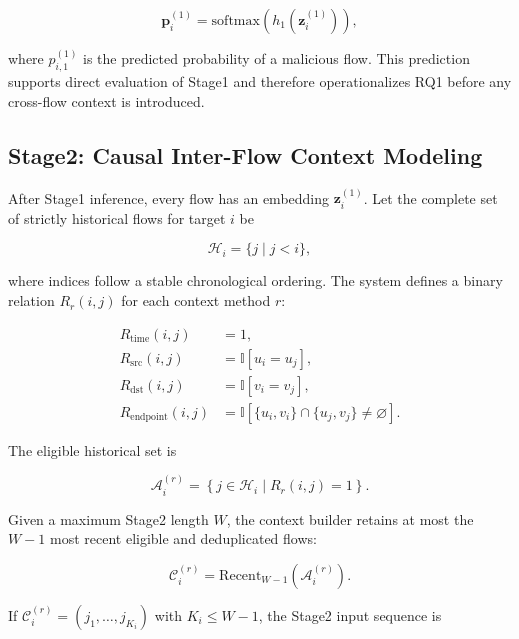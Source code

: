 \begin{equation}
\mathbf{p}^{(1)}_i
=
\mathrm{softmax}
\left(
    h_1(\mathbf{z}^{(1)}_i)
\right),
\end{equation}

where $p^{(1)}_{i,1}$ is the predicted probability of a malicious flow. This
prediction supports direct evaluation of Stage1 and therefore operationalizes
RQ1 before any cross-flow context is introduced.

\subsection{Stage2: Causal Inter-Flow Context Modeling}
\label{subsec:stage2_formulation}

After Stage1 inference, every flow has an embedding
$\mathbf{z}^{(1)}_i$. Let the complete set of strictly historical flows for
target $i$ be

\begin{equation}
\mathcal{H}_i=\{j\mid j<i\},
\end{equation}

where indices follow a stable chronological ordering. The system defines a
binary relation $R_r(i,j)$ for each context method $r$:

\begin{align}
R_{\mathrm{time}}(i,j)
&=1,\\
R_{\mathrm{src}}(i,j)
&=\mathbb{I}[u_i=u_j],\\
R_{\mathrm{dst}}(i,j)
&=\mathbb{I}[v_i=v_j],\\
R_{\mathrm{endpoint}}(i,j)
&=\mathbb{I}
\left[
    \{u_i,v_i\}\cap\{u_j,v_j\}\neq\varnothing
\right].
\end{align}

The eligible historical set is

\begin{equation}
\mathcal{A}^{(r)}_i
=
\left\{
    j\in\mathcal{H}_i
    \mid
    R_r(i,j)=1
\right\}.
\end{equation}

Given a maximum Stage2 length $W$, the context builder retains at most the
$W-1$ most recent eligible and deduplicated flows:

\begin{equation}
\mathcal{C}^{(r)}_i
=
\mathrm{Recent}_{W-1}
\left(
    \mathcal{A}^{(r)}_i
\right).
\label{eq:context_set}
\end{equation}

If
$\mathcal{C}^{(r)}_i=(j_1,\ldots,j_{K_i})$ with $K_i\leq W-1$, the Stage2 input
sequence is

